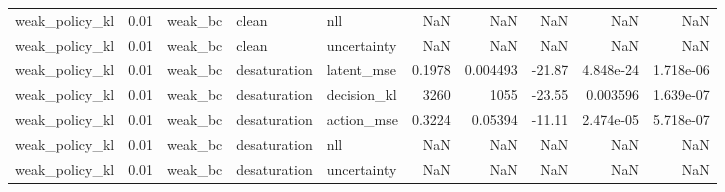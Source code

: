 \begin{tabular}{lrlllrrrrr}
weak\_policy\_kl & 0.01 & weak\_bc & clean & nll & NaN & NaN & NaN & NaN & NaN \\
weak\_policy\_kl & 0.01 & weak\_bc & clean & uncertainty & NaN & NaN & NaN & NaN & NaN \\
weak\_policy\_kl & 0.01 & weak\_bc & desaturation & latent\_mse & 0.1978 & 0.004493 & -21.87 & 4.848e-24 & 1.718e-06 \\
weak\_policy\_kl & 0.01 & weak\_bc & desaturation & decision\_kl & 3260 & 1055 & -23.55 & 0.003596 & 1.639e-07 \\
weak\_policy\_kl & 0.01 & weak\_bc & desaturation & action\_mse & 0.3224 & 0.05394 & -11.11 & 2.474e-05 & 5.718e-07 \\
weak\_policy\_kl & 0.01 & weak\_bc & desaturation & nll & NaN & NaN & NaN & NaN & NaN \\
weak\_policy\_kl & 0.01 & weak\_bc & desaturation & uncertainty & NaN & NaN & NaN & NaN & NaN \\
\bottomrule
\end{tabular}
